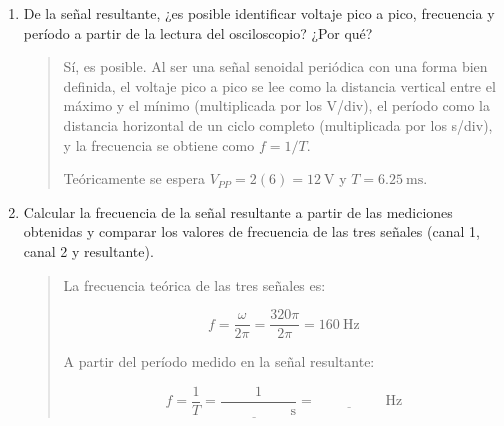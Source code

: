 \documentclass{article}
\newcommand{\vacio}[1][2cm]{\underline{\hspace{#1}}}
\begin{document}
\begin{enumerate}
\begin{enumerate}[label=\alph*)]
\begin{quote}
                \[
                    V_1(t) + V_2(t) = 2\sin(320\pi t) + 4\sin(320\pi t) = 6\sin(320\pi t)\ \si{\volt}
                \]

                Es decir, la señal resultante está en fase con las originales y tiene una amplitud mayor, $V_P = \SI{6}{\volt}$. Esto concuerda con la propiedad de las señales senoidales mencionada en el marco teórico.
            \end{quote}

            \item De la señal resultante, ¿es posible identificar voltaje pico a pico, frecuencia y período a partir de la lectura del osciloscopio? ¿Por qué?

            \begin{quote}
                Sí, es posible. Al ser una señal senoidal periódica con una forma bien definida, el voltaje pico a pico se lee como la distancia vertical entre el máximo y el mínimo (multiplicada por los V/div), el período como la distancia horizontal de un ciclo completo (multiplicada por los s/div), y la frecuencia se obtiene como $f = 1/T$.

                Teóricamente se espera $V_{PP} = 2(6) = \SI{12}{\volt}$ y $T = \SI{6.25}{\milli\second}$.
            \end{quote}

            \item Calcular la frecuencia de la señal resultante a partir de las mediciones obtenidas y comparar los valores de frecuencia de las tres señales (canal 1, canal 2 y resultante).

            \begin{quote}
                La frecuencia teórica de las tres señales es:

                \[
                    f = \frac{\omega}{2\pi} = \frac{320\pi}{2\pi} = \SI{160}{\hertz}
                \]

                A partir del período medido en la señal resultante:

                \[
                    f = \frac{1}{T} = \frac{1}{\vacio\ \si{\second}} = \vacio\ \si{\hertz}
                \]


\end{quote}
\end{enumerate}
\end{enumerate}
\end{document}
